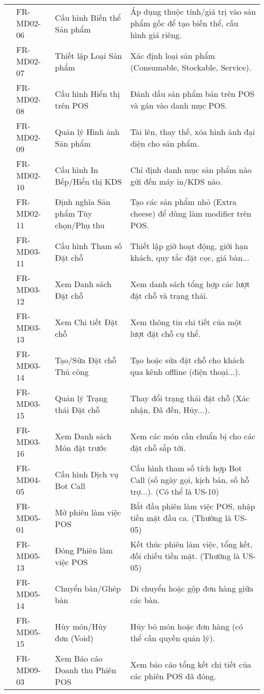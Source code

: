 \begin{longtable}{|m{2.5cm}|m{2.5cm}|m{5cm}|m{5cm}|}
& FR-MD02-06 & Cấu hình Biến thể Sản phẩm & Áp dụng thuộc tính/giá trị vào sản phẩm gốc để tạo biến thể, cấu hình giá riêng. \\
& FR-MD02-07 & Thiết lập Loại Sản phẩm & Xác định loại sản phẩm (Consumable, Stockable, Service). \\
& FR-MD02-08 & Cấu hình Hiển thị trên POS & Đánh dấu sản phẩm bán trên POS và gán vào danh mục POS. \\
& FR-MD02-09 & Quản lý Hình ảnh Sản phẩm & Tải lên, thay thế, xóa hình ảnh đại diện cho sản phẩm. \\
& FR-MD02-10 & Cấu hình In Bếp/Hiển thị KDS & Chỉ định danh mục sản phẩm nào gửi đến máy in/KDS nào. \\
& FR-MD02-11 & Định nghĩa Sản phẩm Tùy chọn/Phụ thu & Tạo các sản phẩm nhỏ (Extra cheese) để dùng làm modifier trên POS. \\ \cline{2-4}
& FR-MD03-11 & Cấu hình Tham số Đặt chỗ & Thiết lập giờ hoạt động, giới hạn khách, quy tắc đặt cọc, giá bàn... \\
& FR-MD03-12 & Xem Danh sách Đặt chỗ & Xem danh sách tổng hợp các lượt đặt chỗ và trạng thái. \\
& FR-MD03-13 & Xem Chi tiết Đặt chỗ & Xem thông tin chi tiết của một lượt đặt chỗ cụ thể. \\
& FR-MD03-14 & Tạo/Sửa Đặt chỗ Thủ công & Tạo hoặc sửa đặt chỗ cho khách qua kênh offline (điện thoại...). \\
& FR-MD03-15 & Quản lý Trạng thái Đặt chỗ & Thay đổi trạng thái đặt chỗ (Xác nhận, Đã đến, Hủy...). \\
& FR-MD03-16 & Xem Danh sách Món đặt trước & Xem các món cần chuẩn bị cho các đặt chỗ sắp tới. \\ \cline{2-4}
& FR-MD04-05 & Cấu hình Dịch vụ Bot Call & Cấu hình tham số tích hợp Bot Call (số ngày gọi, kịch bản, số hỗ trợ...). (Có thể là US-10) \\ \cline{2-4}
& FR-MD05-01 & Mở phiên làm việc POS & Bắt đầu phiên làm việc POS, nhập tiền mặt đầu ca. (Thường là US-05) \\
& FR-MD05-13 & Đóng Phiên làm việc POS & Kết thúc phiên làm việc, tổng kết, đối chiếu tiền mặt. (Thường là US-05) \\
& FR-MD05-14 & Chuyển bàn/Ghép bàn & Di chuyển hoặc gộp đơn hàng giữa các bàn. \\
& FR-MD05-15 & Hủy món/Hủy đơn (Void) & Hủy bỏ món hoặc đơn hàng (có thể cần quyền quản lý). \\ \cline{2-4}
& FR-MD09-03 & Xem Báo cáo Doanh thu Phiên POS & Xem báo cáo tổng kết chi tiết của các phiên POS đã đóng. \\

\end{longtable}
